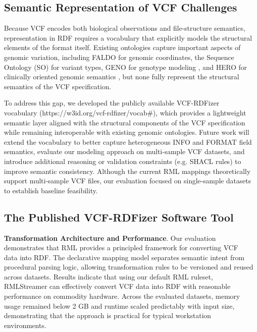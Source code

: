 \documentclass[unnumsec,webpdf,contemporary,large]{oup-authoring-template}
\begin{document}
\subsection{Semantic Representation of VCF Challenges}\label{subsec4.1}
Because VCF encodes both biological observations and file-structure semantics, representation in RDF requires a vocabulary that explicitly models the structural elements of the format itself.
Existing ontologies capture important aspects of genomic variation, including FALDO for genomic coordinates, the Sequence Ontology (SO) \cite{seq_ont_2005} for variant types, GENO for genotype modeling \cite{gene_ont_2000}, and HERO for clinically oriented genomic semantics \cite{hero-genomics_2025}, but none fully represent the structural semantics of the VCF specification. 

To address this gap, we developed the publicly available VCF-RDFizer vocabulary (https://w3id.org/vcf-rdfizer/vocab\#), which provides a lightweight semantic layer aligned with the structural components of the VCF specification while remaining interoperable with existing genomic ontologies. 
Future work will extend the vocabulary to better capture heterogeneous INFO and FORMAT field semantics, evaluate our modeling approach on multi-sample VCF datasets, and introduce additional reasoning or validation constraints (e.g. SHACL rules) to improve semantic consistency. 
Although the current RML mappings theoretically support multi-sample VCF files, our evaluation focused on single-sample datasets to establish baseline feasibility.


\subsection{The Published VCF-RDFizer Software Tool}\label{subsec4.2}

\textbf{Transformation Architecture and Performance}.
Our evaluation demonstrates that RML provides a principled framework for converting VCF data into RDF. 
The declarative mapping model separates semantic intent from procedural parsing logic, allowing transformation rules to be versioned and reused across datasets.
Results indicate that using our default RML ruleset, RMLStreamer can effectively convert VCF data into RDF with reasonable performance on commodity hardware. 
Across the evaluated datasets, memory usage remained below 2 GB and runtime scaled predictably with input size, demonstrating that the approach is practical for typical workstation environments.
\end{document}
